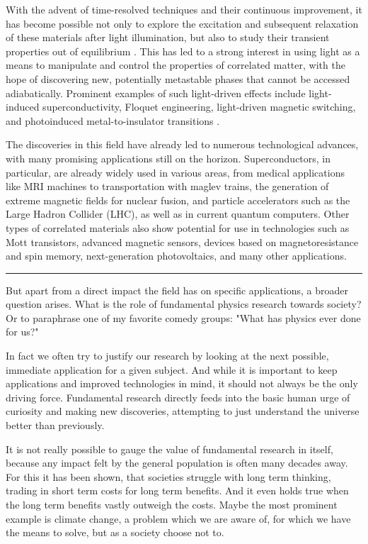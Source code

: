 With the advent of time-resolved techniques and their continuous improvement, it has become possible not only to explore the excitation and subsequent relaxation of these materials after light illumination, but also to study their transient properties out of equilibrium \cite{giannetti_ultrafast_2016}.
This has led to a strong interest in using light as a means to manipulate and control the properties of correlated matter, with the hope of discovering new, potentially metastable phases that cannot be accessed adiabatically.
Prominent examples of such light-driven effects include light-induced superconductivity, Floquet engineering, light-driven magnetic switching, and photoinduced metal-to-insulator transitions \cite{fausti_light-induced_2011,takubo_photoinduced_2008}.

The discoveries in this field have already led to numerous technological advances, with many promising applications still on the horizon.
Superconductors, in particular, are already widely used in various areas, from medical applications like MRI machines to transportation with maglev trains, the generation of extreme magnetic fields for nuclear fusion, and particle accelerators such as the Large Hadron Collider (LHC), as well as in current quantum computers.
Other types of correlated materials also show potential for use in technologies such as Mott transistors, advanced magnetic sensors, devices based on magnetoresistance and spin memory, next-generation photovoltaics, and many other applications.

\begin{center}
	\rule{0.3\textwidth}{.8pt}
\end{center}

But apart from a direct impact the field has on specific applications, a broader question arises.
What is the role of fundamental physics research towards society?
Or to paraphrase one of my favorite comedy groups: "What has physics ever done for us?"

In fact we often try to justify our research by looking at the next possible, immediate application for a given subject.
And while it is important to keep applications and improved technologies in mind, it should not always be the only driving force.
Fundamental research directly feeds into the basic human urge of curiosity and making new discoveries, attempting to just understand the universe better than previously.

It is not really possible to gauge the value of fundamental research in itself, because any impact felt by the general population is often many decades away.
For this it has been shown, that societies struggle with long term thinking, trading in short term costs for long term benefits.
And it even holds true when the long term benefits vastly outweigh the costs.
Maybe the most prominent example is climate change, a problem which we are aware of, for which we have the means to solve, but as a society choose not to.

